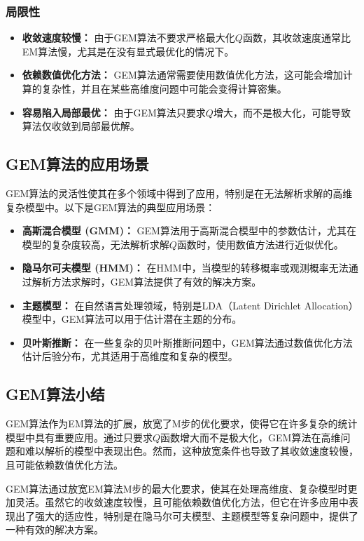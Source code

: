 \documentclass[a4paper,12pt]{ctexart} %
\begin{document}
\subsubsection{局限性}
\begin{itemize}
    \item \textbf{收敛速度较慢：} 由于GEM算法不要求严格最大化$Q$函数，其收敛速度通常比EM算法慢，尤其是在没有显式最优化的情况下。
    \item \textbf{依赖数值优化方法：} GEM算法通常需要使用数值优化方法，这可能会增加计算的复杂性，并且在某些高维度问题中可能会变得计算密集。
    \item \textbf{容易陷入局部最优：} 由于GEM算法只要求$Q$增大，而不是极大化，可能导致算法仅收敛到局部最优解。
\end{itemize}

\subsection{GEM算法的应用场景}

GEM算法的灵活性使其在多个领域中得到了应用，特别是在无法解析求解的高维复杂模型中。以下是GEM算法的典型应用场景：

\begin{itemize}
    \item \textbf{高斯混合模型 (GMM)：} GEM算法用于高斯混合模型中的参数估计，尤其在模型的复杂度较高，无法解析求解$Q$函数时，使用数值方法进行近似优化。
    \item \textbf{隐马尔可夫模型 (HMM)：} 在HMM中，当模型的转移概率或观测概率无法通过解析方法求解时，GEM算法提供了有效的解决方案。
    \item \textbf{主题模型：} 在自然语言处理领域，特别是LDA（Latent Dirichlet Allocation）模型中，GEM算法可以用于估计潜在主题的分布。
    \item \textbf{贝叶斯推断：} 在一些复杂的贝叶斯推断问题中，GEM算法通过数值优化方法估计后验分布，尤其适用于高维度和复杂的模型。
\end{itemize}

\subsection{GEM算法小结}

GEM算法作为EM算法的扩展，放宽了M步的优化要求，使得它在许多复杂的统计模型中具有重要应用。通过只要求$Q$函数增大而不是极大化，GEM算法在高维问题和难以解析的模型中表现出色。然而，这种放宽条件也导致了其收敛速度较慢，且可能依赖数值优化方法。

\begin{learnbox}{\kaishu
GEM算法通过放宽EM算法M步的最大化要求，使其在处理高维度、复杂模型时更加灵活。虽然它的收敛速度较慢，且可能依赖数值优化方法，但它在许多应用中表现出了强大的适应性，特别是在隐马尔可夫模型、主题模型等复杂问题中，提供了一种有效的解决方案。}
\end{learnbox}
\end{document}
